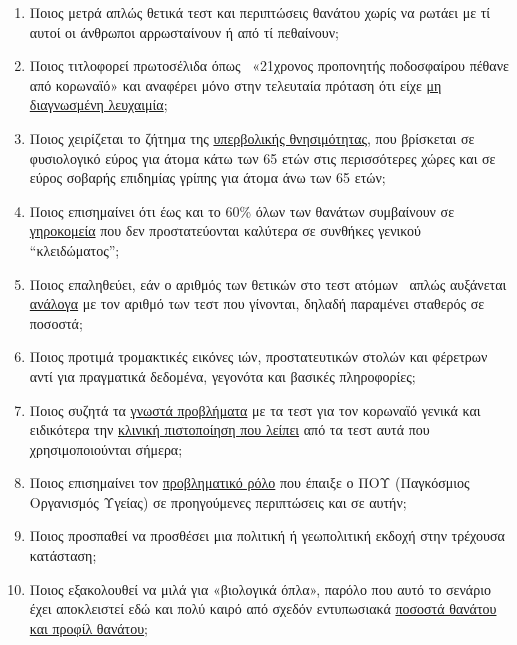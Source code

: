\begin{enumerate}
\def\labelenumi{\arabic{enumi}.}
\tightlist
\item
  Ποιος μετρά απλώς θετικά τεστ και περιπτώσεις θανάτου χωρίς να ρωτάει
  με τί αυτοί οι άνθρωποι αρρωσταίνουν ή από τί πεθαίνουν;
\item
  Ποιος τιτλοφορεί πρωτοσέλιδα όπως~ «21χρονος προπονητής ποδοσφαίρου
  πέθανε από κορωναϊό» και αναφέρει μόνο στην τελευταία πρόταση ότι είχε
  \href{https://sports.yahoo.com/spanish-football-coach-francisco-garcia-163153573.html}{μη
  διαγνωσμένη λευχαιμία};
\item
  Ποιος χειρίζεται το ζήτημα της
  \href{https://www.euromomo.eu/index.html}{υπερβολικής θνησιμότητας},
  που βρίσκεται σε φυσιολογικό εύρος για άτομα κάτω των 65 ετών στις
  περισσότερες χώρες και σε εύρος σοβαρής επιδημίας γρίπης για άτομα άνω
  των 65 ετών;
\item
  Ποιος επισημαίνει ότι έως και το 60\% όλων των θανάτων συμβαίνουν σε
  \href{https://ltccovid.org/2020/04/12/mortality-associated-with-covid-19-outbreaks-in-care-homes-early-international-evidence/}{γηροκομεία}
  που δεν προστατεύονται καλύτερα σε συνθήκες γενικού ``κλειδώματος'';
\item
  Ποιος επαληθεύει, εάν ο αριθμός των θετικών στο τεστ ατόμων~ απλώς
  αυξάνεται
  \href{https://multipolar-magazin.de/artikel/coronavirus-irrefuhrung-fallzahlen}{ανάλογα}
  με τον αριθμό των τεστ που γίνονται, δηλαδή παραμένει σταθερός σε
  ποσοστά;
\item
  Ποιος προτιμά τρομακτικές εικόνες ιών, προστατευτικών στολών και
  φέρετρων αντί για πραγματικά δεδομένα, γεγονότα και βασικές
  πληροφορίες;
\item
  Ποιος συζητά τα
  \href{https://www.ncbi.nlm.nih.gov/pmc/articles/PMC2095096/}{γνωστά
  προβλήματα} με τα τεστ για τον κορωναϊό γενικά και ειδικότερα την
  \href{https://www.creative-diagnostics.com/sars-cov-2-coronavirus-multiplex-rt-qpcr-kit-277854-457.htm}{κλινική
  πιστοποίηση που λείπει} από τα τεστ αυτά που χρησιμοποιούνται σήμερα;
\item
  Ποιος επισημαίνει τον
  \href{https://www.forbes.com/2010/02/05/world-health-organization-swine-flu-pandemic-opinions-contributors-michael-fumento.html\#208eef4048e8}{προβληματικό
  ρόλο} που έπαιξε ο ΠΟΥ (Παγκόσμιος Οργανισμός Υγείας) σε προηγούμενες
  περιπτώσεις και σε αυτήν;
\item
  Ποιος προσπαθεί να προσθέσει μια πολιτική ή γεωπολιτική εκδοχή στην
  τρέχουσα κατάσταση;
\item
  Ποιος εξακολουθεί να μιλά για «βιολογικά όπλα», παρόλο που αυτό το
  σενάριο έχει αποκλειστεί εδώ και πολύ καιρό από σχεδόν εντυπωσιακά
  \href{https://www.statnews.com/2020/03/17/a-fiasco-in-the-making-as-the-coronavirus-pandemic-takes-hold-we-are-making-decisions-without-reliable-data/}{ποσοστά
  θανάτου και προφίλ θανάτου};
\end{enumerate}


